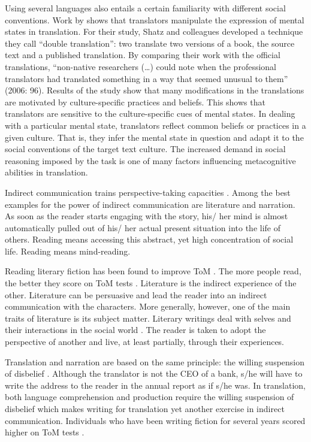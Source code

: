 \documentclass[output=paper]{LSP/langsci}
\begin{document}
Using several languages also entails a certain familiarity with different social conventions. Work by \citet{Shatz2006} shows that translators manipulate the expression of mental states in translation. For their study, Shatz and colleagues \citeyearpar{Shatz2006} developed a technique they call ``double translation'': two  translate two versions of a book, the source text and a published translation. By comparing their work with the official translations, ``non-native researchers (\ldots) could note when the professional translators had translated something in a way that seemed unusual to them'' (2006: 96). Results of the study show that many modifications in the translations are motivated by culture-specific practices and beliefs. This shows that translators are sensitive to the culture-specific cues of mental states. In dealing with a particular mental state, translators reflect common beliefs or practices in a given culture. That is, they infer the mental state in question and adapt it to the social conventions of the target text culture. The increased demand in social reasoning imposed by the task is one of many factors influencing metacognitive abilities in translation.


Indirect communication trains perspective-taking capacities \citep{Djikic2013}. Among the best examples for the power of indirect communication are literature and narration. As soon as the reader starts engaging with the story, his/ her mind is almost automatically pulled out of his/ her actual present situation into the life of others. Reading means accessing this abstract, yet high concentration of social life. Reading means mind-reading.


Reading literary fiction has been found to improve ToM \citep{Djikic2014}. The more people read, the better they score on ToM tests \citep{Djikic2014}. Literature is the indirect experience of the other. Literature can be persuasive and lead the reader into an indirect communication with the characters. More generally, however, one of the main traits of literature is its subject matter. Literary writings deal with selves and their interactions in the social world \citep{Djikic2014}. The reader is taken to adopt the perspective of another and live, at least partially, through their experiences.


\largerpage
Translation and narration are based on the same principle: the willing suspension of disbelief \citep{Pym1998}. Although the translator is not the CEO of a bank, s/he will have to write the address to the reader in the annual report as if s/he was. In translation, both language comprehension and production require the willing suspension of disbelief which makes writing for translation yet another exercise in indirect communication. Individuals who have been writing fiction for several years scored higher on ToM tests \citep[17]{Djikic2013}. 
\end{document}
